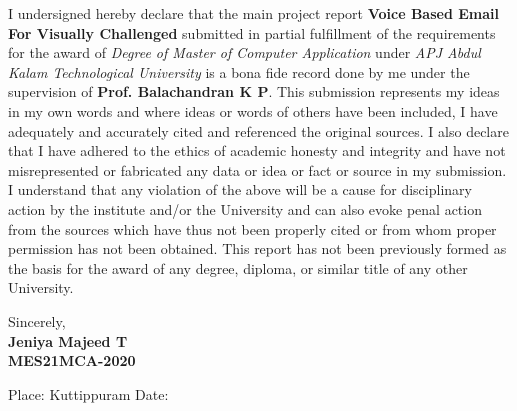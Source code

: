 \documentclass[12pt]{report}
\begin{document}
I undersigned hereby declare that the main project report \textbf{Voice Based Email For Visually Challenged } submitted in partial fulfillment of the requirements for the award of \textit{Degree of Master of Computer Application} under \textit{APJ Abdul Kalam Technological University} is a bona fide record done by me under the supervision of \textbf{Prof. Balachandran K P}. This submission represents my ideas in my own words and where ideas or words of others have been included, I have adequately and accurately cited and referenced the original sources. I also declare that I have adhered to the ethics of academic honesty and integrity and have not misrepresented or fabricated any data or idea or fact or source in my submission. I understand that any violation of the above will be a cause for disciplinary action by the institute and/or the University and can also evoke penal action from the sources which have thus not been properly cited or from whom proper permission has not been obtained. This report has not been previously formed as the basis for the award of any degree, diploma, or similar title of any other University.

\vspace{3cm}


\begin{flushright}
Sincerely, \\
\textbf{Jeniya Majeed T \\
MES21MCA-2020}\\
\end{flushright}

\begin{flushleft}
Place: Kuttippuram \newline \newline
Date:
\end{flushleft}
\end{document}
